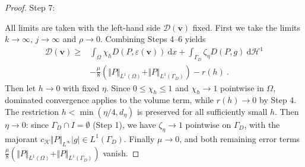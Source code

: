 \documentclass{article}
\theoremstyle{definition}
\newcommand{\bfv}{\boldsymbol{v}}
\newcommand{\K}{\mathcal{K}}
\newcommand{\D}{\mathcal{D}}
\newcommand{\dd}{\:\mathrm{d}}
\begin{document}
\begin{proof}
Step 7:

All limits are taken with the left-hand side $\D(\bfv)$ fixed. First we take the limits $k\rightarrow \infty$,
$j\rightarrow \infty$ and $\rho\rightarrow 0$. Combining Steps 4--6 yields
\begin{align*}
    \D(\bfv)\geq{}&\int_\Omega\chi_hD(P,\varepsilon(\bfv))\dd x
    +\int_{\Gamma_D}\zeta_\eta D(P,g)\dd\mathcal{H}^1\\
    &-\frac{\mu}{8}\left(\Vert P\Vert_{L^1(\Omega)}+\Vert P\Vert_{L^1(\Gamma_D)}\right)-r(h) \ .
\end{align*}
Then let $h\rightarrow0$ with fixed $\eta$. Since $0\leq\chi_h\leq1$ and $\chi_h\rightarrow1$ pointwise in $\Omega$,
dominated convergence applies to the volume term, while $r(h)\rightarrow0$ by Step 4.
The restriction $h<\min(\eta/4,d_\eta)$ is preserved for all sufficiently small $h$.
Then $\eta \rightarrow 0$: since $\Gamma_D \cap I = \emptyset$ (Step 1), we have $\zeta_\eta \rightarrow 1$ pointwise
on $\Gamma_D$, with the majorant $c_\K \Vert P \Vert_{L^{\infty}}|g|\in L^{1}(\Gamma_D)$. Finally $\mu \rightarrow 0$,
and both remaining error terms $\frac{\mu}{8}(\Vert P\Vert_{L^{1}(\Omega)}+\Vert P\Vert_{L^{1}(\Gamma_D)})$ vanish.
\end{proof}
\end{document}

